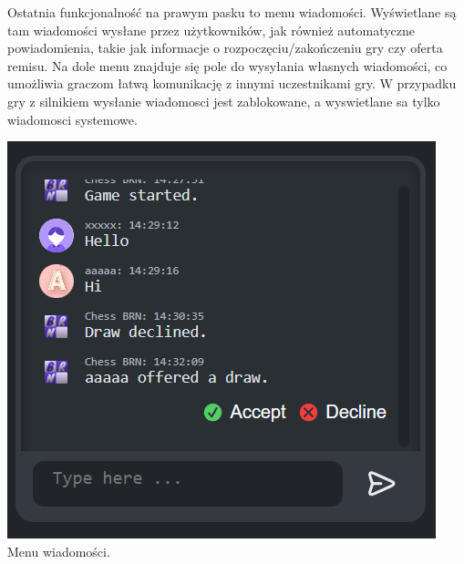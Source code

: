 \documentclass[12pt,a4paper]{article}
\begin{document}
\begin{minipage}[t]{0.45\textwidth} 
    \vspace{0pt} 
    \raggedright 
    Ostatnia funkcjonalność na prawym pasku to menu wiadomości. Wyświetlane są tam wiadomości wysłane przez użytkowników, jak również automatyczne powiadomienia, takie jak informacje o rozpoczęciu/zakończeniu gry czy oferta remisu. Na dole menu znajduje się pole do wysyłania własnych wiadomości, co umożliwia graczom łatwą komunikację z innymi uczestnikami gry. W przypadku gry z silnikiem wysłanie wiadomosci jest zablokowane, a wyswietlane sa tylko wiadomosci systemowe.
\end{minipage} 
\hfill 
\begin{minipage}[t]{0.45\textwidth} 
    \vspace{0pt} 
    \centering 
    \includegraphics[width=\linewidth]{images/ins_min_mess.png} 
    Menu wiadomości.
\end{minipage}

\newpage
\end{document}
